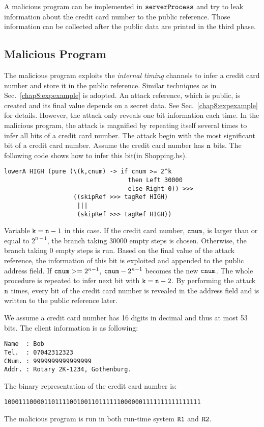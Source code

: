 \documentclass{report}
\newcommand{\co}[1]{$\cod{#1}$}
\begin{document}
A malicious program can be implemented in \co{serverProcess} and try to leak information about the credit card 
number to the public reference. Those information can be collected after the public data are printed in the 
third phase. 

\subsection{Malicious Program}
The malicious program exploits the {\em internal timing} channels to infer a credit card number and store it
in the public reference. Similar techniques as in Sec.~\ref{chap8:expexample} is adopted. 
An attack reference, which is public, is created and its final value depends on a secret data.
See Sec.~\ref{chap8:expexample} for details.
However, the attack only reveals one bit information each time. In the malicious program, the attack
is magnified by repeating itself several times to infer all bits of a credit card number. 
The attack begin with the most significant bit of a credit card number. Assume the credit card number has
\co{n} bits. The following code shows how to infer this bit(in Shopping.hs).
\begin{Verbatim}[fontsize=\small]
lowerA HIGH (pure (\(k,cnum) -> if cnum >= 2^k 
                                  then Left 30000 
                                  else Right 0)) >>>
                   ((skipRef >>> tagRef HIGH)
                    |||
                    (skipRef >>> tagRef HIGH))
\end{Verbatim}
Variable $\mathtt{k} =\mathtt{n} -1$ in this case. If the credit card number, \co{cnum}, is larger than or equal to $2^{n-1}$, 
the branch taking $30000$ empty steps is chosen. Otherwise, the branch taking $0$ empty steps is run.  
Based on the final value of the attack reference, the information of this 
bit is exploited and appended to the public address field. 
If $\mathtt{cnum} >=2^{n-1}$, $\mathtt{cnum} -2^{n-1}$ becomes the new \co{cnum}. The whole procedure
is repeated to infer next bit with $\mathtt{k} =\mathtt{n} -2$.
By performing the attack \co{n} times, every bit of the credit card number is revealed in the address field and 
is written to the public reference later.

We assume a credit card number has 16 digits in decimal and thus at most 53 bits. 
The client information is as following:
\begin{Verbatim}[fontsize=\small]
Name  : Bob
Tel.  : 07042312323
CNum. : 9999999999999999
Addr. : Rotary 2K-1234, Gothenburg.
\end{Verbatim}
The binary representation of the credit card number is:
\begin{Verbatim}[fontsize=\small]
100011100001101111001001101111110000001111111111111111
\end{Verbatim}
The malicious program is run in both run-time system \co{R1} and \co{R2}. 
\end{document}

